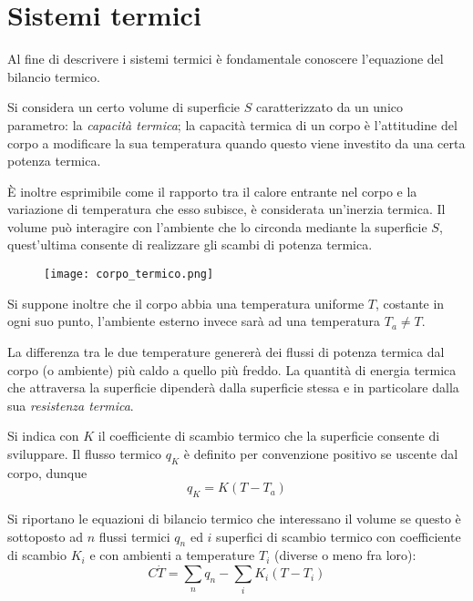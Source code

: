 
\section{Sistemi termici}
Al fine di descrivere i sistemi termici è fondamentale conoscere l'equazione
del bilancio termico.

Si considera un certo volume di superficie $S$ caratterizzato da un unico
parametro: la \textit{capacità termica}; la capacità termica di un corpo è
l'attitudine del corpo a modificare la sua temperatura quando questo viene
investito da una certa potenza termica.

È inoltre esprimibile come il rapporto tra il calore entrante nel corpo e la
variazione di temperatura che esso subisce, è considerata un'inerzia termica.
Il volume può interagire con l'ambiente che lo circonda mediante la superficie
$S$, quest'ultima consente di realizzare gli scambi di potenza termica.
\begin{figure}
 \centering
 \texttt{[image: corpo\_termico.png]}
 \label{Fig.:corpo_termico}
\end{figure}

Si suppone inoltre che il corpo abbia una temperatura uniforme $T$, costante in
ogni suo punto, l'ambiente esterno invece sarà ad una temperatura $T_a\neq T$.

La differenza tra le due temperature genererà dei flussi di potenza termica dal
corpo (o ambiente) più caldo a quello più freddo.
La quantità di energia termica che attraversa la superficie dipenderà dalla
superficie stessa e in particolare dalla sua \textit{resistenza termica}.

Si indica con $K$ il coefficiente di scambio termico che la superficie consente
di sviluppare.
Il flusso termico $q_K$ è definito per convenzione positivo se uscente dal
corpo, dunque
$$
q_K = K(T-T_a)
$$

Si riportano le equazioni di bilancio termico che interessano il volume se
questo è sottoposto ad $n$ flussi termici $q_n$ ed $i$ superfici di scambio
termico con coefficiente di scambio $K_i$ e con ambienti a temperature $T_i$
(diverse o meno fra loro):
\begin{equation}
C\dot{T} = \sum_n q_n -\sum_i K_i(T-T_i)
\label{eq.:bilancio_termico}
\end{equation}

